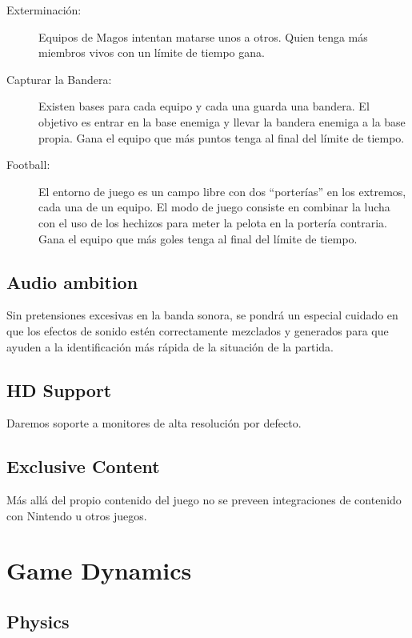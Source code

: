 \documentclass[12pt]{article}
\begin{document}
\begin{description}
\item[Exterminación:] Equipos de Magos intentan matarse unos a otros. Quien tenga más miembros vivos con un límite de tiempo gana.
\item[Capturar la Bandera:] Existen bases para cada equipo y cada una guarda una bandera. El objetivo es entrar en la base enemiga y llevar la bandera enemiga a la base propia. Gana el equipo que más puntos tenga al final del límite de tiempo.
\item[Football:] El entorno de juego es un campo libre con dos ``porterías'' en los extremos, cada una de un equipo. El modo de juego consiste en combinar la lucha con el uso de los hechizos para meter la pelota en la portería contraria. Gana el equipo que más goles tenga al final del límite de tiempo.
\end{description}

\subsection{Audio ambition}

Sin pretensiones excesivas en la banda sonora, se pondrá un especial cuidado en que los efectos de sonido estén correctamente mezclados y generados para que ayuden a la identificación más rápida de la situación de la partida.

\subsection{HD Support}

Daremos soporte a monitores de alta resolución por defecto.

\subsection{Exclusive Content}

Más allá del propio contenido del juego no se preveen integraciones de contenido con Nintendo u otros juegos.

\newpage  

\section{Game Dynamics}

\subsection{Physics}
\end{document}
